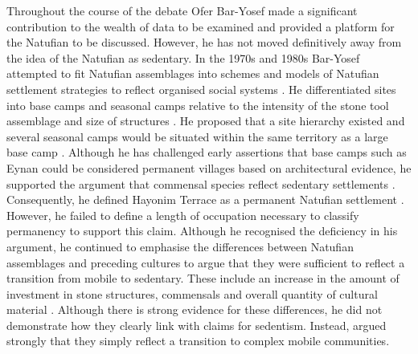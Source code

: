Throughout the course of the debate Ofer Bar-Yosef made a significant contribution to the wealth of data to be examined and provided a platform for the Natufian to be discussed. However, he has not moved definitively away from the idea of the Natufian as sedentary. 
In the 1970s and 1980s Bar-Yosef attempted to fit Natufian assemblages into schemes and models of Natufian settlement strategies to reflect organised social systems \parencite[25]{Bar-Yosef_1983}. 
He differentiated sites into base camps and seasonal camps relative to the intensity of the stone tool assemblage and size of structures \parencite[14]{Bar-Yosef_1983}. 
He proposed that a site hierarchy existed and several seasonal camps would be situated within the same territory as a large base camp \parencite[25]{Bar-Yosef_1983}. 
Although he has challenged early assertions that base camps such as Eynan could be considered permanent villages based on architectural evidence, he supported the argument that commensal species reflect sedentary settlements \parencite[5]{Bar-Yosef_1991}. 
Consequently, he defined Hayonim Terrace as a permanent Natufian settlement \parencite[25]{Bar-Yosef_1983}.  
However, he failed to define a length of occupation necessary to classify permanency to support this claim. Although he recognised the deficiency in his argument, he continued to emphasise the differences between Natufian assemblages and preceding cultures to argue that they were sufficient to reflect a transition from mobile to sedentary. 
These include an increase in the amount of investment in stone structures, commensals and overall quantity of cultural material \parencite[6]{Bar-Yosef_1991}. Although there is strong evidence for these differences, he did not demonstrate how they clearly link with claims for sedentism. 
Instead, \textcite[56]{Shewan_2004} argued strongly that they simply reflect a transition to complex mobile communities. 

